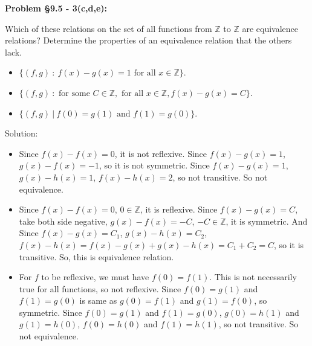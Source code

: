 \documentclass{article}
\newenvironment{problem}[1]
{\begin{mdframed}[default]
\textbf{Problem #1:}
}
{\end{mdframed}
}
\begin{document}
\begin{problem}{\S 9.5 - 3(c,d,e)}
Which of these relations on the set of all functions from $\mathbb{Z}$ to $\mathbb{Z}$ are equivalence relations? Determine the properties of an equivalence
relation that the others lack.
\begin{itemize}
\item[(c)] $\{ (f,g)~:~ f(x)-g(x) = 1 \textrm{ for all } x \in \mathbb{Z}\}$.
\item[(d)] $\{ (f,g)~: \textrm{ for some } C \in \mathbb{Z}, \textrm{ for all }
x \in \mathbb{Z}, f(x) - g(x) = C \}$.
\item[(e)] $\{ (f,g)~|~f(0) = g(1) \textrm{ and } f(1) = g(0) \}$.
\end{itemize}
Solution:
\begin{itemize}
    \item[(c)] Since $f(x)-f(x)=0$, it is not reflexive. Since $f(x)-g(x)=1$, $g(x)-f(x)=-1$, so it is not symmetric. Since $f(x)-g(x)=1$, $g(x)-h(x)=1$, $f(x)-h(x)=2$, so not transitive. So not equivalence.
    \item[(d)] Since $f(x)-f(x)=0$, $0\in \mathbb{Z}$, it is reflexive. Since $f(x)-g(x)=C$, take both side negative, $g(x)-f(x)=-C$, $-C\in \mathbb{Z}$, it is symmetric. And 
    Since $f(x)-g(x)=C_1$, $g(x)-h(x)=C_2$, $f(x)-h(x)=f(x)-g(x)+g(x)-h(x)=C_1+C_2=C$, so it is transitive. So, this is equivalence relation.
    \item[(e)] For $f$ to be reflexive, we must have $f(0)=f(1)$. This is not necessarily true for all functions, so not reflexive. Since $f(0)=g(1)$ and $f(1)=g(0)$ is same as $g(0)=f(1)$ and $g(1)=f(0)$, so symmetric. Since $f(0)=g(1)$ and $f(1)=g(0)$, $g(0)=h(1)$ and $g(1)=h(0)$, $f(0)=h(0)$ and $f(1)=h(1)$, so not transitive. So not equivalence.
\end{itemize}
\end{problem}
\end{document}
